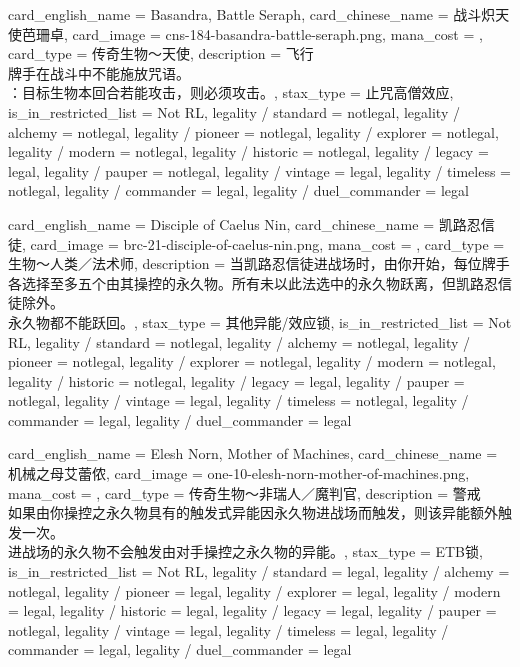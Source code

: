 \documentclass[lang = cn, color = black, 10pt]{AllThatStax}
\begin{document}
\card
{
	card_english_name = {Basandra, Battle Seraph},
	card_chinese_name = {战斗炽天使芭珊卓},
	card_image = cns-184-basandra-battle-seraph.png,
	mana_cost = ,
	card_type = 传奇生物～天使,
	description = {飞行\\
牌手在战斗中不能施放咒语。\\
：目标生物本回合若能攻击，则必须攻击。},
	stax_type = 止咒高僧效应,
	is_in_restricted_list = Not RL,
	legality / standard = notlegal,
	legality / alchemy = notlegal,
	legality / pioneer = notlegal,
	legality / explorer = notlegal,
	legality / modern = notlegal,
	legality / historic = notlegal,
	legality / legacy = legal,
	legality / pauper = notlegal,
	legality / vintage = legal,
	legality / timeless = notlegal,
	legality / commander = legal,
	legality / duel_commander = legal
}

\card
{
	card_english_name = {Disciple of Caelus Nin},
	card_chinese_name = {凯路忍信徒},
	card_image = brc-21-disciple-of-caelus-nin.png,
	mana_cost = ,
	card_type = 生物～人类／法术师,
	description = {当凯路忍信徒进战场时，由你开始，每位牌手各选择至多五个由其操控的永久物。所有未以此法选中的永久物跃离，但凯路忍信徒除外。\\
永久物都不能跃回。},
	stax_type = 其他异能/效应锁,
	is_in_restricted_list = Not RL,
	legality / standard = notlegal,
	legality / alchemy = notlegal,
	legality / pioneer = notlegal,
	legality / explorer = notlegal,
	legality / modern = notlegal,
	legality / historic = notlegal,
	legality / legacy = legal,
	legality / pauper = notlegal,
	legality / vintage = legal,
	legality / timeless = notlegal,
	legality / commander = legal,
	legality / duel_commander = legal
}

\card
{
	card_english_name = {Elesh Norn, Mother of Machines},
	card_chinese_name = {机械之母艾蕾侬},
	card_image = one-10-elesh-norn-mother-of-machines.png,
	mana_cost = ,
	card_type = 传奇生物～非瑞人／魔判官,
	description = {警戒\\
如果由你操控之永久物具有的触发式异能因永久物进战场而触发，则该异能额外触发一次。\\
进战场的永久物不会触发由对手操控之永久物的异能。},
	stax_type = ETB锁,
	is_in_restricted_list = Not RL,
	legality / standard = legal,
	legality / alchemy = notlegal,
	legality / pioneer = legal,
	legality / explorer = legal,
	legality / modern = legal,
	legality / historic = legal,
	legality / legacy = legal,
	legality / pauper = notlegal,
	legality / vintage = legal,
	legality / timeless = legal,
	legality / commander = legal,
	legality / duel_commander = legal
}
\end{document}
